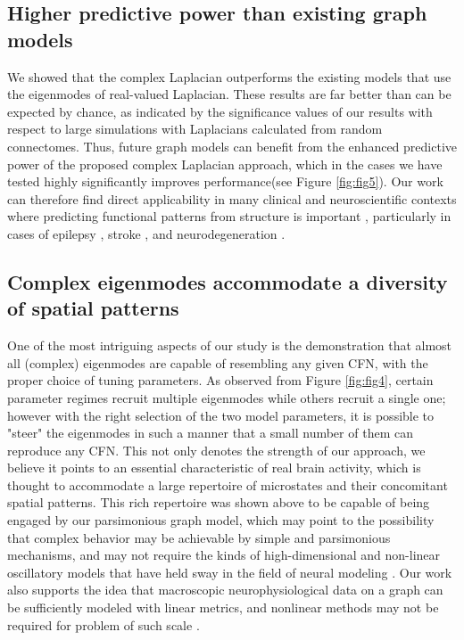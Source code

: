 \subsection{Higher predictive power than existing graph models}
We showed that the complex Laplacian outperforms the existing models that use the eigenmodes of real-valued Laplacian. These results are far better than can be expected by chance, as indicated by the significance values of our results with respect to large simulations with Laplacians calculated from random connectomes. Thus, future graph models can benefit from the enhanced predictive power of the proposed complex Laplacian approach, which in the cases we have tested highly significantly improves performance(see Figure \ref{fig:fig5}). Our work can therefore find direct applicability in many clinical and neuroscientific contexts where predicting functional patterns from structure is important \cite{jiang_brainnetome_2013, fornito_connectomics_2015}, particularly in cases of epilepsy \cite{coan_frequent_2014}, stroke \cite{Kuceyeski2016, rehme_cerebral_2013}, and neurodegeneration \cite{Zimmermann2018}.

\subsection{Complex eigenmodes accommodate a diversity of spatial patterns}
One of the most intriguing aspects of our study is the demonstration that almost all (complex) eigenmodes are capable of resembling any given CFN, with the proper choice of tuning parameters. As observed from Figure \ref{fig:fig4}, certain parameter regimes recruit multiple eigenmodes while others recruit a single one; however with the right selection of the two model parameters, it is possible to "steer" the eigenmodes in such a manner that a small number of them can reproduce any CFN. This not only denotes the strength of our approach, we believe it points to an essential characteristic of real brain activity, which is thought to accommodate a large repertoire of microstates and their concomitant spatial patterns. This rich repertoire was shown above to be capable of being engaged by our parsimonious graph model, which may point to the possibility that complex behavior may be achievable by simple and parsimonious mechanisms, and may not require the kinds of high-dimensional and non-linear oscillatory models that have held sway in the field of neural modeling \cite{honey_predicting_2009, jirsa_derivation_1997}. Our work also supports the idea that macroscopic neurophysiological data on a graph can be sufficiently modeled with linear metrics, and nonlinear methods may not be required for problem of such scale \cite{hlinka_functional_2011, hartman_role_2011}.

